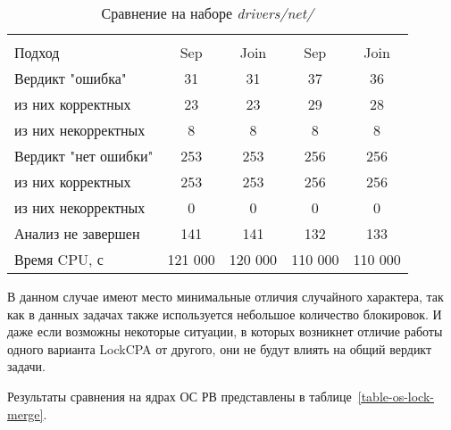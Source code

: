   \begin{table}[h]\footnotesize \centering
    \caption{Сравнение на наборе \textit{drivers/net/}}
  	\label{table-drivers-lock-merge}
    \begin{tabular}{ | l | c | c | c | c | }
      \hline
      		& 		\multicolumn{2}{c|}{\theoryraces} 	& \multicolumn{2}{c|}{\combatmode}  \\
      Подход         				& Sep 		& Join 		& Sep 		& Join   	\\ \hline
      Вердикт "ошибка" 				& 31   		& 31   		& 37   		& 36   		\\ 
  \hspace{0.5cm} из них корректных 	& 23 		& 23 		& 29   		& 28     	\\ 
  \hspace{0.5cm} из них некорректных & 8 		& 8 		& 8   		& 8     	\\ \hline
      Вердикт "нет ошибки"  		& 253    	& 253   	& 256    	& 256      	\\ 
  \hspace{0.5cm} из них корректных 	& 253 		& 253   	& 256    	& 256     	\\
  \hspace{0.5cm} из них некорректных & 0 		& 0    		& 0     	& 0  		\\ \hline
      Анализ не завершен       		& 141    	& 141   	& 132    	& 133     	\\ \hline
      Время CPU, с   				& 121 000 	& 120 000 	& 110 000 	& 110 000   \\ 
      \hline
    \end{tabular}
  \end{table}

В данном случае имеют место минимальные отличия случайного характера, так как в данных задачах также используется небольшое количество блокировок. 
И даже если возможны некоторые ситуации, в которых возникнет отличие работы одного варианта LockCPA от другого, они не будут влиять на общий вердикт задачи.

Результаты сравнения на ядрах ОС РВ представлены в таблице~\ref{table-os-lock-merge}.

